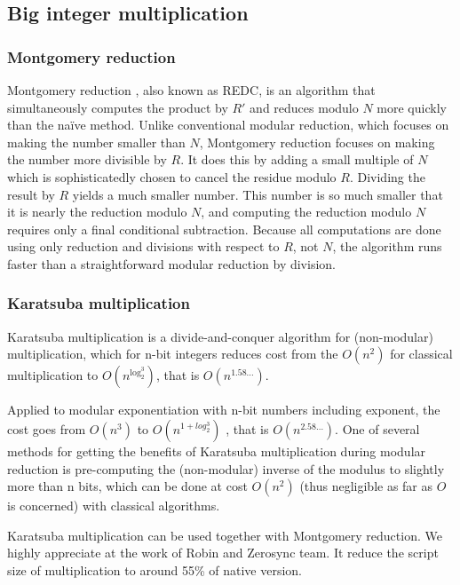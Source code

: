 \subsection{Big integer multiplication}

\subsubsection{Montgomery reduction}

Montgomery reduction \cite{website:Montgomery}, also known as REDC, is an algorithm that simultaneously computes the product by $R'$ and 
reduces modulo $N$ more quickly than the naïve method. Unlike conventional modular reduction, 
which focuses on making the number smaller than $N$, Montgomery reduction focuses on making the number more divisible by $R$. 
It does this by adding a small multiple of $N$ which is sophisticatedly chosen to cancel the residue modulo $R$. 
Dividing the result by $R$ yields a much smaller number. 
This number is so much smaller that it is nearly the reduction modulo $N$, and 
computing the reduction modulo $N$ requires only a final conditional subtraction. 
Because all computations are done using only reduction and divisions with respect to $R$, not $N$, the algorithm runs faster than
a straightforward modular reduction by division.


\subsubsection{Karatsuba multiplication}
Karatsuba multiplication \cite{website:Karatsuba} is a divide-and-conquer algorithm for (non-modular) multiplication, which for n-bit integers reduces cost from the $O(n^2)$
for classical multiplication to $O(n^{\log_2^3})$, that is $O(n^{1.58…})$.

Applied to modular exponentiation with n-bit numbers including exponent, the cost goes from $O(n^3)$ to $O(n^{1+log_2^3})$
, that is $O(n^{2.58…})$. One of several methods for getting the benefits of Karatsuba multiplication during modular reduction is pre-computing the (non-modular) 
inverse of the modulus to slightly more than n bits, which can be done at cost $O(n^2)$ (thus negligible as far as $O$
 is concerned) with classical algorithms.

Karatsuba multiplication can be used together with Montgomery reduction. We highly appreciate at the work \cite{website:PR75} of Robin and Zerosync team. It reduce
the script size of multiplication to around 55\% of native version.
